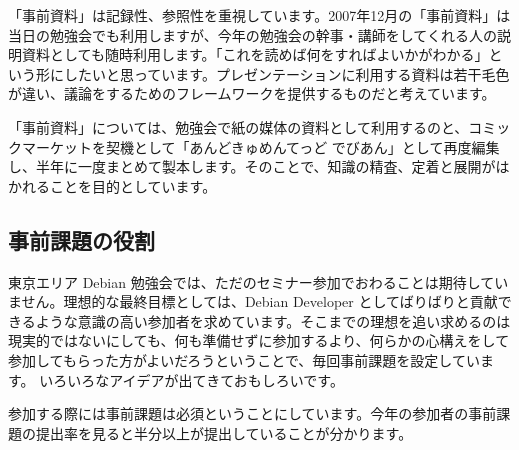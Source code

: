 \documentclass[mingoth,a4paper]{jsarticle}
\begin{document}
「事前資料」は記録性、参照性を重視しています。2007年12月の「事前資料」は
当日の勉強会でも利用しますが、今年の勉強会の幹事・講師をしてくれる人の説
明資料としても随時利用します。「これを読めば何をすればよいかがわかる」と
いう形にしたいと思っています。プレゼンテーションに利用する資料は若干毛色
が違い、議論をするためのフレームワークを提供するものだと考えています。

「事前資料」については、勉強会で紙の媒体の資料として利用するのと、コミッ
クマーケットを契機として「あんどきゅめんてっど でびあん」として再度編集
し、半年に一度まとめて製本します。そのことで、知識の精査、定着と展開がは
かれることを目的としています。

\subsection{事前課題の役割}

東京エリア Debian 勉強会では、ただのセミナー参加でおわることは期待してい
ません。理想的な最終目標としては、Debian Developer としてばりばりと貢献で
きるような意識の高い参加者を求めています。そこまでの理想を追い求めるのは
現実的ではないにしても、何も準備せずに参加するより、何らかの心構えをして
参加してもらった方がよいだろうということで、毎回事前課題を設定しています。
いろいろなアイデアが出てきておもしろいです。

参加する際には事前課題は必須ということにしています。今年の参加者の事前課
題の提出率を見ると半分以上が提出していることが分かります。
\end{document}

